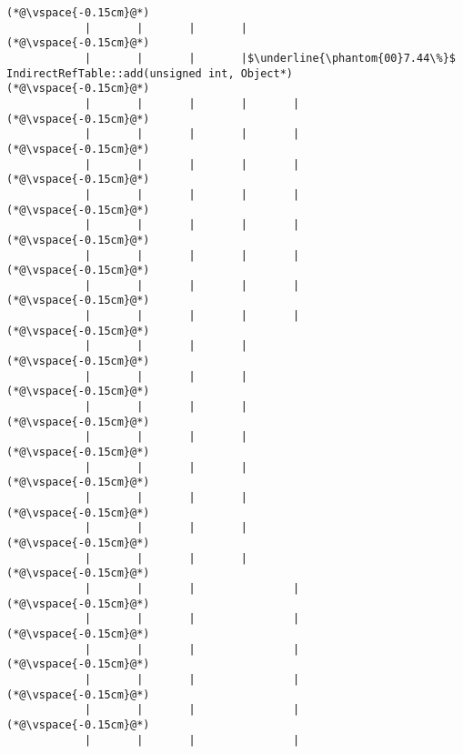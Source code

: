 \begin{lstlisting}[caption=20 viiteparametria Java$\to$C , label=profile:J2CBenchmark00206, numberbychapter=true, frame=lines, float, floatplacement=t]
(*@\vspace{-0.15cm}@*)
            |       |       |       |
(*@\vspace{-0.15cm}@*)
            |       |       |       |$\underline{\phantom{00}7.44\%}$ IndirectRefTable::add(unsigned int, Object*)
(*@\vspace{-0.15cm}@*)
            |       |       |       |       |
(*@\vspace{-0.15cm}@*)
            |       |       |       |       |
(*@\vspace{-0.15cm}@*)
            |       |       |       |       |
(*@\vspace{-0.15cm}@*)
            |       |       |       |       |
(*@\vspace{-0.15cm}@*)
            |       |       |       |       |
(*@\vspace{-0.15cm}@*)
            |       |       |       |       |
(*@\vspace{-0.15cm}@*)
            |       |       |       |       |
(*@\vspace{-0.15cm}@*)
            |       |       |       |       |
(*@\vspace{-0.15cm}@*)
            |       |       |       |
(*@\vspace{-0.15cm}@*)
            |       |       |       |
(*@\vspace{-0.15cm}@*)
            |       |       |       |
(*@\vspace{-0.15cm}@*)
            |       |       |       |
(*@\vspace{-0.15cm}@*)
            |       |       |       |
(*@\vspace{-0.15cm}@*)
            |       |       |       |
(*@\vspace{-0.15cm}@*)
            |       |       |       |
(*@\vspace{-0.15cm}@*)
            |       |       |       |
(*@\vspace{-0.15cm}@*)
            |       |       |               |
(*@\vspace{-0.15cm}@*)
            |       |       |               |
(*@\vspace{-0.15cm}@*)
            |       |       |               |
(*@\vspace{-0.15cm}@*)
            |       |       |               |
(*@\vspace{-0.15cm}@*)
            |       |       |               |
(*@\vspace{-0.15cm}@*)
            |       |       |               |

\end{lstlisting}
